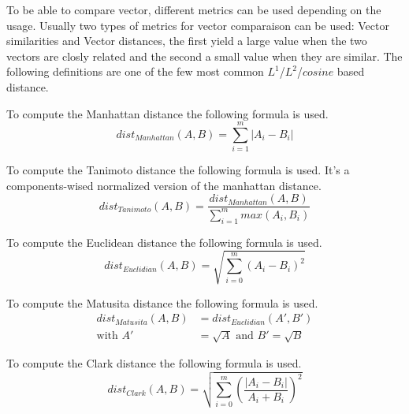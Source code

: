 To be able to compare vector, different metrics can be used depending on the usage.
Usually two types of metrics for vector comparaison can be used: Vector similarities and Vector distances, the first yield a large value when the two vectors are closly related and the second a small value when they are similar.
The following definitions are one of the few most common $L^1$/$L^2$/$cosine$ based distance.

\begin{definition}
  To compute the Manhattan distance the following formula is used.
  \begin{equation}
    dist_{Manhattan}(A, B) = \sum_{i=1}^{m} |A_i - B_i|
  \end{equation}
\end{definition}

\begin{definition}
  To compute the Tanimoto distance the following formula is used.
  It's a components-wised normalized version of the manhattan distance.
  \begin{equation}
    dist_{Tanimoto}(A, B) = \frac{dist_{Manhattan}(A, B)}{\sum_{i=1}^{m} max(A_i, B_i)}
  \end{equation}
\end{definition}

\begin{definition}
  To compute the Euclidean distance the following formula is used.
  \begin{equation}
    dist_{Euclidian}(A, B) = \sqrt{\sum_{i=0}^{m}(A_i - B_i)^2}
  \end{equation}
\end{definition}

\begin{definition}
  To compute the Matusita distance the following formula is used.
  \begin{equation}
    \begin{split}
      dist_{Matusita}(A, B) &= dist_{Euclidian}(A', B') \\
      \text{with }A' &= \sqrt{A}\text{ and }B' = \sqrt{B}
    \end{split}
  \end{equation}
\end{definition}

\begin{definition}
  To compute the Clark distance the following formula is used.
  \begin{equation}
    dist_{Clark}(A, B) = \sqrt{\sum_{i=0}^{m}\left(\frac{|A_i - B_i|}{A_i + B_i}\right)^2}
  \end{equation}
\end{definition}

